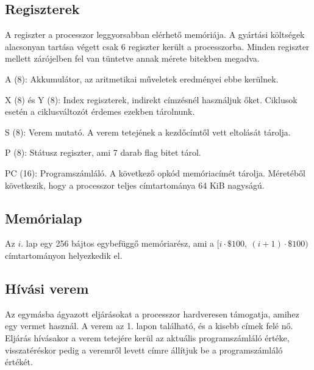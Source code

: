 \subsection{Regiszterek}
A regiszter a processzor leggyorsabban elérhető memóriája.
A gyártási költségek alacsonyan tartása végett csak 6 regiszter került a processzorba.
Minden regiszter mellett zárójelben fel van tüntetve annak mérete bitekben megadva.

\begin{compactdesc}
	\item[A (8):] Akkumulátor, az aritmetikai műveletek eredményei ebbe kerülnek.
	\item[X (8) és Y (8):] 
	Index regiszterek, indirekt címzésnél használjuk őket.
	Ciklusok esetén a ciklusváltozót érdemes ezekben tárolnunk.
	\item[S (8):] 
	Verem mutató. A verem tetejének a kezdőcímtől vett eltolását tárolja.
	\item[P (8):]
	Státusz regiszter, ami 7 darab flag bitet tárol.
	\item[PC (16):]
	Programszámláló. 
	A következő opkód memóriacímét tárolja.
	Méretéből következik, hogy a processzor teljes címtartománya 64 KiB nagyságú.
\end{compactdesc}


\subsection{Memórialap}
Az $i$. lap egy 256 bájtos egybefüggő memóriarész, ami a $ [i \cdot \$100, \: (i+1) \cdot \$100) $ címtartományon helyezkedik el.

\subsection{Hívási verem}
Az egymásba ágyazott eljárásokat a processzor hardveresen támogatja, amihez egy vermet használ.
A verem az 1. lapon található, és a kisebb címek felé nő.
Eljárás hívásakor a verem tetejére kerül az aktuális programszámláló értéke, 
visszatéréskor pedig a veremről levett címre állítjuk be a programszámláló értékét.

